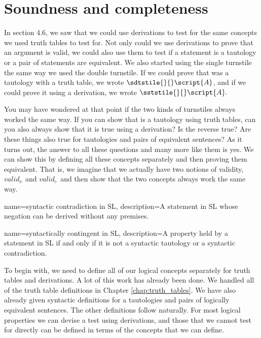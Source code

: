 
\section{Soundness and completeness}
\label{sec:soundness_and_completeness}
In section 4.6, we saw that we could use derivations to test for the same concepts we used truth tables to test for. Not only could we use derivations to prove that an argument is valid, we could also use them to test if a statement is a tautology or a pair of statements are equivalent. We also started using the single turnstile the same way we used the double turnstile. If we could prove that  was a tautology with a truth table, we wrote $\sdtstile{}{}\script{A}$, and if we could prove it using a derivation, we wrote $\sststile{}{}\script{A}.$ 

You may have wondered at that point if the two kinds of turnstiles always worked the same way. If you can show that  is a tautology using truth tables, can you also always show that it is true using a derivation? Is the reverse true? Are these things also true for tautologies and pairs of equivalent sentences? As it turns out, the answer to all these questions and many more like them is yes. We can show this by defining all these concepts separately and then proving them equivalent. That is, we imagine that we actually have two notions of validity, $valid_{\models}$ and  $valid_{\vdash}$ and then show that the two concepts always work the same way. 

{
name=syntactic contradiction in SL,
description={A statement in SL whose negation can be derived without any premises.}
}


   
{
name=syntactically contingent in SL,
description={A property held by a statement in SL if and only if it is not a syntactic tautology or a syntactic contradiction.}
}




To begin with, we need to define all of our logical concepts separately for truth tables and derivations. A lot of this work has already been done. We handled all of the truth table definitions in Chapter \ref{chap:truth_tables}. We have also already given syntactic definitions for a tautologies and pairs of logically equivalent sentences. The other definitions follow naturally. For most logical properties we can devise a test using derivations, and those that we cannot test for directly can be defined in terms of the concepts that we can define.

